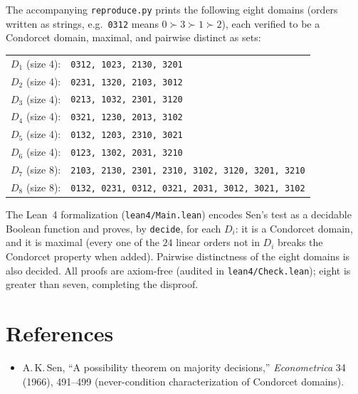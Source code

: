 \documentclass[11pt]{article}
\begin{document}
The accompanying \texttt{reproduce.py} prints the following eight domains
(orders written as strings, e.g.\ \texttt{0312} means $0 \succ 3 \succ 1 \succ
2$), each verified to be a Condorcet domain, maximal, and pairwise distinct as
sets:

\begin{center}
\begin{tabular}{rl}
  $D_1$ (size 4): & \texttt{0312, 1023, 2130, 3201} \\
  $D_2$ (size 4): & \texttt{0231, 1320, 2103, 3012} \\
  $D_3$ (size 4): & \texttt{0213, 1032, 2301, 3120} \\
  $D_4$ (size 4): & \texttt{0321, 1230, 2013, 3102} \\
  $D_5$ (size 4): & \texttt{0132, 1203, 2310, 3021} \\
  $D_6$ (size 4): & \texttt{0123, 1302, 2031, 3210} \\
  $D_7$ (size 8): & \texttt{2103, 2130, 2301, 2310, 3102, 3120, 3201, 3210} \\
  $D_8$ (size 8): & \texttt{0132, 0231, 0312, 0321, 2031, 3012, 3021, 3102}
\end{tabular}
\end{center}

The Lean~4 formalization (\texttt{lean4/Main.lean}) encodes Sen's test as a
decidable Boolean function and proves, by \texttt{decide}, for each
$D_i$: it is a Condorcet domain, and it is maximal (every one of the $24$
linear orders not in $D_i$ breaks the Condorcet property when added).
Pairwise distinctness of the eight domains is also decided.  All proofs are
axiom-free (audited in \texttt{lean4/Check.lean}); eight is greater than
seven, completing the disproof.

\section*{References}
\begin{itemize}
  \item A.\,K.\,Sen, ``A possibility theorem on majority decisions,''
    \textit{Econometrica} 34 (1966), 491--499 (never-condition characterization
    of Condorcet domains).
\end{itemize}
\end{document}
